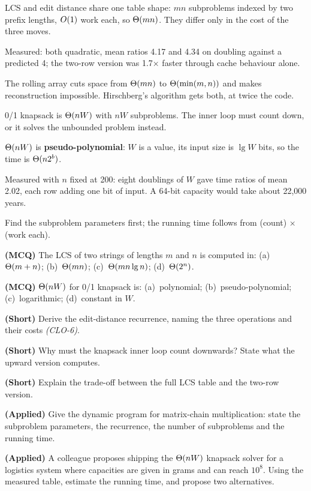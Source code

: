 \begin{chaptersummary}
\begin{tight}
  \item LCS and edit distance share one table shape: $mn$ subproblems indexed
        by two prefix lengths, $O(1)$ work each, so $\Theta(mn)$. They
        differ only in the cost of the three moves.
  \item Measured: both quadratic, mean ratios 4.17 and 4.34 on doubling against
        a predicted 4; the two-row version was 1.7$\times$ faster through cache
        behaviour alone.
  \item The rolling array cuts space from $\Theta(mn)$ to $\Theta(\min(m,n))$
        and makes reconstruction impossible. Hirschberg's algorithm gets both,
        at twice the code.
  \item 0/1 knapsack is $\Theta(nW)$ with $nW$ subproblems. The inner loop must
        count down, or it solves the unbounded problem instead.
  \item $\Theta(nW)$ is \textbf{pseudo-polynomial}: $W$ is a value, its input
        size is $\lg W$ bits, so the time is $\Theta(n2^{b})$.
  \item Measured with $n$ fixed at 200: eight doublings of $W$ gave time ratios
        of mean 2.02, each row adding one bit of input. A 64-bit capacity would
        take about 22{,}000 years.
  \item Find the subproblem parameters first; the running time follows from
        (count) $\times$ (work each).
\end{tight}
\end{chaptersummary}

\begin{reviewq}
  \item \textbf{(MCQ)} The LCS of two strings of lengths $m$ and $n$ is computed
        in: (a)~$\Theta(m+n)$; (b)~$\Theta(mn)$; (c)~$\Theta(mn\operatorname{lg} n)$;
        (d)~$\Theta(2^{n})$.
  \item \textbf{(MCQ)} $\Theta(nW)$ for 0/1 knapsack is:
        (a)~polynomial; (b)~pseudo-polynomial; (c)~logarithmic;
        (d)~constant in $W$.
  \item \textbf{(Short)} Derive the edit-distance recurrence, naming the three
        operations and their costs \emph{(CLO-6)}.
  \item \textbf{(Short)} Why must the knapsack inner loop count downwards?
        State what the upward version computes.
  \item \textbf{(Short)} Explain the trade-off between the full LCS table and
        the two-row version.
  \item \textbf{(Applied)} Give the dynamic program for matrix-chain
        multiplication: state the subproblem parameters, the recurrence, the
        number of subproblems and the running time.
  \item \textbf{(Applied)} A colleague proposes shipping the $\Theta(nW)$
        knapsack solver for a logistics system where capacities are given in
        grams and can reach $10^{8}$. Using the measured table, estimate the
        running time, and propose two alternatives.
\end{reviewq}
